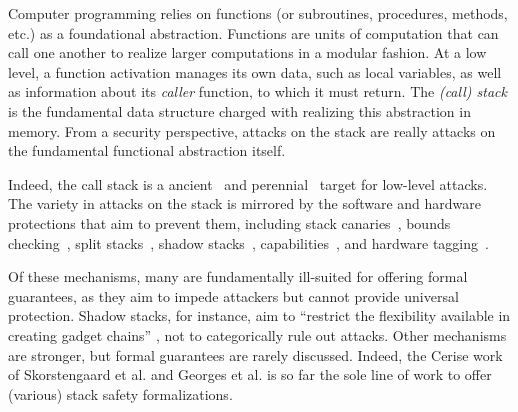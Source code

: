 \documentclass[10pt,conference]{ieeetran}%
\theoremstyle{definition}
\begin{document}
Computer programming relies on functions (or subroutines, procedures, methods, etc.)
as a foundational abstraction. Functions are units of computation that
can call one another to realize larger computations in a modular fashion.
%
At a low level, a function activation manages its own data, such as local variables, as
well as information about its \emph{caller} function, to which it must return.
The \emph{(call) stack} is the fundamental data structure charged with realizing
this abstraction in memory.  From a security perspective, attacks on the stack are really attacks
on the fundamental functional abstraction itself. %

Indeed, the call stack is a ancient~\cite{one06phrack} and perennial~\cite{mitre-cwe,DBLP:conf/raid/VeendCB12,
  DBLP:conf/sp/SzekeresPWS13,
  DBLP:conf/sp/HuSACSL16,msrc-bluehat,chromium-security}
  target for low-level attacks. 
%
%
The variety in attacks on the stack is mirrored by the
software and hardware protections that aim to prevent them,
%
including stack canaries~\cite{Cowan+98},
bounds checking~\cite{NagarakatteZMZ09,NagarakatteZMZ10,DeviettiBMZ08},
split stacks~\cite{Kuznetsov+14},
shadow stacks~\cite{Dang+15,Shanbhogue+19},
capabilities~\cite{Woodruff+14,Chisnall+15,SkorstengaardLocal,SkorstengaardSTKJFP,Georges22:TempsDesCerises},
and hardware tagging~\cite{DBLP:conf/sp/RoesslerD18,Gollapudi+23}.

Of these mechanisms, many are fundamentally ill-suited for offering formal guarantees,
as they aim to impede attackers but cannot provide universal protection. Shadow stacks,
for instance, aim to ``restrict the flexibility available in creating gadget chains''
\cite{Shanbhogue+19}, not to categorically
rule out attacks. Other mechanisms are stronger, but formal
guarantees are rarely discussed.
Indeed, the Cerise work of Skorstengaard et al. \cite{SkorstengaardSTKJFP} and
Georges et al. \cite{Georges22:TempsDesCerises} is so far the sole line of work
to offer (various) stack safety formalizations.
\end{document}
